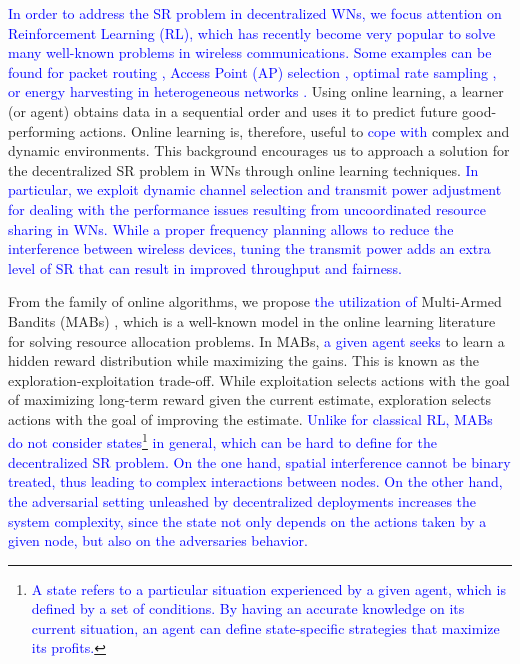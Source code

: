 \documentclass[preprint,12pt]{elsarticle}
\newcommand{\francesc}[1]{\textcolor{blue}{#1}}
\begin{document}
\francesc{In order to address the SR problem in decentralized WNs, we focus attention on Reinforcement Learning (RL), which has recently become very popular to solve many well-known problems in wireless communications. Some examples can be found for packet routing \cite{littman1993distributed}, Access Point (AP) selection \cite{bojovic2011supervised, bojovic2012neural}, optimal rate sampling \cite{combes2014optimal}, or energy harvesting in heterogeneous networks \cite{miozzo2015distributed}.} Using online learning, a learner (or agent) obtains data in a sequential order and uses it to predict future good-performing actions. Online learning is, therefore, useful to \francesc{cope with} complex and dynamic environments. This background encourages us to approach a solution for the decentralized SR problem in WNs through online learning techniques. \francesc{In particular, we exploit dynamic \francesc{channel selection} and transmit power adjustment \francesc{for dealing} with the performance issues resulting from uncoordinated resource sharing in WNs. While a proper frequency planning allows to reduce the interference between wireless devices, tuning the transmit power adds an extra level of SR that can result in improved throughput and fairness.}

From the family of online algorithms, we propose \francesc{the utilization of} Multi-Armed Bandits (MABs) \cite{BCB12}, which is a well-known model in the online learning literature for solving resource allocation problems. In MABs, \francesc{a given agent seeks} to learn a hidden reward distribution while maximizing the gains. This is known as the exploration-exploitation trade-off. %
While exploitation selects actions with the goal of maximizing long-term reward given the current estimate, exploration selects actions with the goal of improving the estimate. \francesc{Unlike for classical RL, MABs do not consider states\footnote{\francesc{A state refers to a particular situation experienced by a given agent, which is defined by a set of conditions. By having an accurate knowledge on its current situation, an agent can define state-specific strategies that maximize its profits.}} in general, which can be hard to define for the decentralized SR problem. On the one hand, spatial interference cannot be binary treated, thus leading to complex interactions between nodes. On the other hand, the adversarial setting unleashed by decentralized deployments increases the system complexity, since the state not only depends on the actions taken by a given node, but also on the adversaries behavior.}
\end{document}

